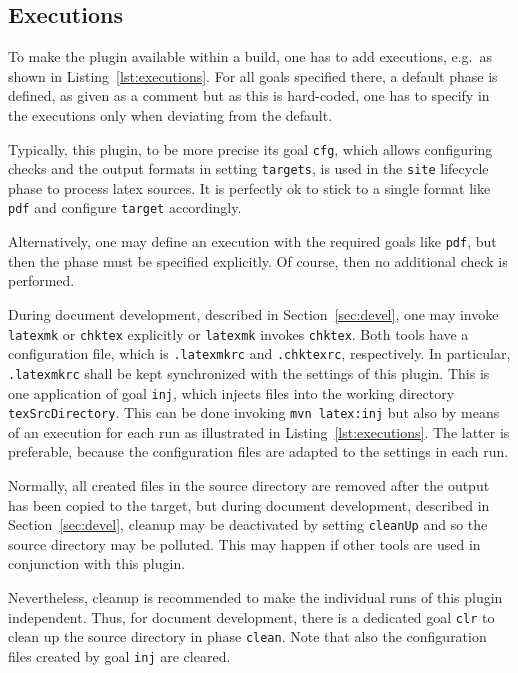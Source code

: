 \subsection{Executions}\label{subsec:xmlPomExecutions}

To make the plugin available within a build,
one has to add executions, e.g.~as shown in Listing~\ref{lst:executions}. 
For all goals specified there, a default phase is defined, 
as given as a comment but as this is hard-coded, 
one has to specify in the executions only 
when deviating from the default. 

Typically, this plugin, to be more precise its goal \texttt{cfg}, 
which allows configuring checks and the output formats in setting \texttt{targets},  
is used in the \texttt{site} lifecycle phase 
to process latex sources. 
It is perfectly ok to stick to a single format like \texttt{pdf} 
and configure \texttt{target} accordingly. 

Alternatively, one may define an execution with the required goals like \texttt{pdf}, 
but then the phase must be specified explicitly. 
Of course, then no additional check is performed. 

During document development, described in Section~\ref{sec:devel}, 
one may invoke \texttt{latexmk} or \texttt{chktex} explicitly 
or \texttt{latexmk} invokes \texttt{chktex}. 
Both tools have a configuration file, 
which is \texttt{.latexmkrc} and \texttt{.chktexrc}, respectively. 
In particular, \texttt{.latexmkrc} 
shall be kept synchronized with the settings of this plugin. 
This is one application of goal \texttt{inj}, 
which injects files into the working directory \texttt{texSrcDirectory}. 
This can be done invoking \texttt{mvn latex:inj} 
but also by means of an execution for each run 
as illustrated in Listing~\ref{lst:executions}. 
The latter is preferable, because the configuration files 
are adapted to the settings in each run. 

Normally, all created files in the source directory are removed 
after the output has been copied to the target, 
but during document development, described in Section~\ref{sec:devel}, 
cleanup may be deactivated by setting \texttt{cleanUp} 
and so the source directory may be polluted. 
This may happen if other tools are used in conjunction with this plugin. 

Nevertheless, cleanup is recommended to make the individual runs of this plugin independent.
Thus, for document development, there is a dedicated goal \texttt{clr} 
to clean up the source directory in phase \texttt{clean}. 
Note that also the configuration files created by goal \texttt{inj} are cleared. 

